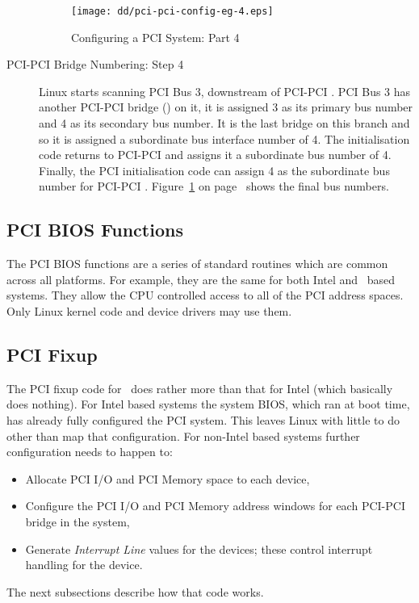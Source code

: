 \begin{description}
\begin{figure}
\begin{center}
{\centering \texttt{[image: dd/pci-pci-config-eg-4.eps]} \par}
\end{center}
\caption{Configuring a PCI System: Part 4}
\label{pci-pci-config-eg-4}
\end{figure}
\item [PCI-PCI Bridge Numbering: Step 4]
Linux starts scanning PCI Bus 3,  downstream of PCI-PCI .
PCI Bus 3 has another PCI-PCI bridge () on it, it is assigned 3 as its
primary bus number and 4 as its secondary bus number.
It is the last bridge on this branch and so it is assigned a subordinate bus
interface number of 4.
The initialisation code returns to PCI-PCI  and assigns it a
subordinate bus number of 4.
Finally, the PCI initialisation code can assign 4 as the 
subordinate bus number for PCI-PCI .
Figure~\ref{pci-pci-config-eg-4} on page~\pageref{pci-pci-config-eg-4} 
shows the final bus numbers.
\end{description}

\subsection{PCI BIOS Functions}
The PCI BIOS functions are a series of standard routines which are common
across all platforms.
For example, they are the same for both Intel and \axp\ based systems.
They allow the CPU controlled access to all of the PCI address spaces.
Only Linux kernel code and device drivers may use them.

\subsection{PCI Fixup}
The PCI fixup code for \axp\ does rather more than that for Intel (which
basically does nothing).
For Intel based systems the system BIOS, which ran at boot time, has already
fully configured the PCI system.
This leaves Linux with little to do other than map that configuration.
For non-Intel based systems further configuration needs to happen to:
\begin{itemize}
	\item Allocate PCI I/O and PCI Memory space to each device,
	\item Configure the PCI I/O and PCI Memory address windows for each PCI-PCI bridge 
	in the system,
	\item Generate {\em Interrupt Line} values for the devices; these control interrupt
		handling for the device.
\end{itemize}
The next subsections describe how that code works.

